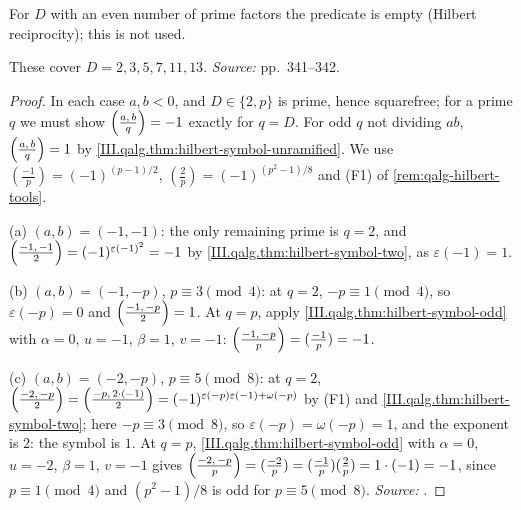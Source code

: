 \begin{definition}
\end{definition}
\noindent For $D$ with an even number of prime factors the predicate is empty (Hilbert reciprocity); this is not used.

\begin{theorem}
\end{theorem}
\noindent These cover $D=2,3,5,7,11,13$. \emph{Source:} \cite{Piz} pp.~341--342.
\begin{proof}
In each case $a,b<0$, and $D\in\{2,p\}$ is prime, hence squarefree; for a prime $q$ we must show $\Bigl(\tfrac{a,\,b}{q}\Bigr)=-1$ exactly for $q=D$. For odd $q$
not dividing $ab$, $\Bigl(\tfrac{a,\,b}{q}\Bigr)=1$ by \cref{III.qalg.thm:hilbert-symbol-unramified}. We use $(\frac{-1}p)=(-1)^{(p-1)/2}$, $(\frac2p)=(-1)^{(p^2-1)/8}$ and
(F1) of \cref{rem:qalg-hilbert-tools}.

(a) $(a,b)=(-1,-1)$: the only remaining prime is $q=2$, and $\Bigl(\tfrac{-1,\,-1}{2}\Bigr)=(-1)^{\varepsilon(-1)^2}=-1$ by \cref{III.qalg.thm:hilbert-symbol-two}, as
$\varepsilon(-1)=1$.

(b) $(a,b)=(-1,-p)$, $p\equiv3\pmod4$: at $q=2$, $-p\equiv1\pmod 4$, so $\varepsilon(-p)=0$ and $\Bigl(\tfrac{-1,\,-p}{2}\Bigr)=1$. At $q=p$, apply
\cref{III.qalg.thm:hilbert-symbol-odd} with $\alpha=0$, $u=-1$, $\beta=1$, $v=-1$: $\Bigl(\tfrac{-1,\,-p}{p}\Bigr)=(\frac{-1}p)=-1$.

(c) $(a,b)=(-2,-p)$, $p\equiv5\pmod8$: at $q=2$, $\Bigl(\tfrac{-2,\,-p}{2}\Bigr)=\Bigl(\tfrac{-p,\,2\cdot(-1)}{2}\Bigr)=(-1)^{\varepsilon(-p)\varepsilon(-1)+\omega(-p)}$ by (F1) and
\cref{III.qalg.thm:hilbert-symbol-two}; here $-p\equiv3\pmod8$, so $\varepsilon(-p)=\omega(-p)=1$, and the exponent is $2$: the symbol is $1$. At $q=p$,
\cref{III.qalg.thm:hilbert-symbol-odd} with $\alpha=0$, $u=-2$, $\beta=1$, $v=-1$ gives $\Bigl(\tfrac{-2,\,-p}{p}\Bigr)=(\frac{-2}p)=(\frac{-1}p)(\frac2p)=1\cdot(-1)=-1$,
since $p\equiv1\pmod 4$ and $(p^2-1)/8$ is odd for $p\equiv5\pmod8$. \emph{Source:} \cite[pp.~341--342]{Piz}.
\end{proof}

